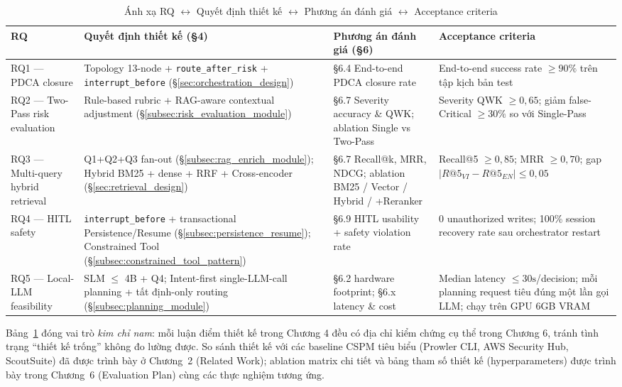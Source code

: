 \begin{table}[!htb]
  \centering
  \caption{Ánh xạ RQ $\leftrightarrow$ Quyết định thiết kế $\leftrightarrow$ Phương án đánh giá $\leftrightarrow$ Acceptance criteria}
  \label{tab:rq_mapping}
  \renewcommand{\arraystretch}{1.35}
  \setlength{\tabcolsep}{3pt}
  \scriptsize
  \begin{tabular}{|p{1.8cm}|p{4.0cm}|p{3.0cm}|p{4.0cm}|}
    \hline
    \textbf{RQ} & \textbf{Quyết định thiết kế (\S{}4)} & \textbf{Phương án đánh giá (\S{}6)} & \textbf{Acceptance criteria}\,\protect\footnotemark[1] \\ \hline
    RQ1 --- PDCA closure & Topology 13-node + \texttt{route\_after\_risk} + \texttt{interrupt\_before} (\S\ref{sec:orchestration_design}) & \S{}6.4 End-to-end PDCA closure rate & End-to-end success rate $\geq 90\%$ trên tập kịch bản test \\ \hline
    RQ2 --- Two-Pass risk evaluation & Rule-based rubric + RAG-aware contextual adjustment (\S\ref{subsec:risk_evaluation_module}) & \S{}6.7 Severity accuracy \& QWK; ablation Single vs Two-Pass & Severity QWK $\geq 0{,}65$; giảm false-Critical $\geq 30\%$ so với Single-Pass \\ \hline
    RQ3 --- Multi-query hybrid retrieval & Q1+Q2+Q3 fan-out (\S\ref{subsec:rag_enrich_module}); Hybrid BM25 + dense + RRF + Cross-encoder (\S\ref{sec:retrieval_design}) & \S{}6.7 Recall@k, MRR, NDCG; ablation BM25 / Vector / Hybrid / +Reranker & Recall@5 $\geq 0{,}85$; MRR $\geq 0{,}70$; gap $|R@5_{VI}-R@5_{EN}| \leq 0{,}05$ \\ \hline
    RQ4 --- HITL safety & \texttt{interrupt\_before} + transactional Persistence/Resume (\S\ref{subsec:persistence_resume}); Constrained Tool (\S\ref{subsec:constrained_tool_pattern}) & \S{}6.9 HITL usability + safety violation rate & 0 unauthorized writes; 100\% session recovery rate sau orchestrator restart \\ \hline
    RQ5 --- Local-LLM feasibility & SLM $\leq$ 4B + Q4; Intent-first single-LLM-call planning + tất định-only routing (\S\ref{subsec:planning_module}) & \S{}6.2 hardware footprint; \S{}6.x latency \& cost & Median latency $\leq 30\text{s}$/decision; mỗi planning request tiêu đúng một lần gọi LLM; chạy trên GPU 6GB VRAM \\ \hline
  \end{tabular}
\end{table}


Bảng~\ref{tab:rq_mapping} đóng vai trò \textit{kim chỉ nam}: mỗi luận điểm thiết kế trong Chương 4 đều có địa chỉ kiểm chứng cụ thể trong Chương 6, tránh tình trạng ``thiết kế trống'' không đo lường được. So sánh thiết kế với các baseline CSPM tiêu biểu (Prowler CLI, AWS Security Hub, ScoutSuite) đã được trình bày ở Chương~2 (Related Work); ablation matrix chi tiết và bảng tham số thiết kế (hyperparameters) được trình bày trong Chương~6 (Evaluation Plan) cùng các thực nghiệm tương ứng.

